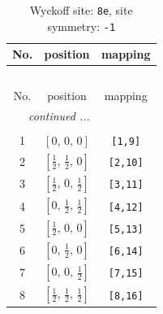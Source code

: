 \documentclass[fleqn,8pt]{jsarticle}
\begin{document}
\renewcommand{\arraystretch}{1.2}
\begin{longtable}{ccc}
\caption{Wyckoff site: {\tt 8e}, site symmetry: {\tt -1}}
 \\
 \hline \hline
No. & position & mapping \\ \hline \endfirsthead

\multicolumn{2}{l}{\tablename\ \thetable{}} \\
 \hline \hline
No. & position & mapping \\ \hline \endhead

 \hline \hline
\multicolumn{2}{r}{\footnotesize\it continued ...} \\ \endfoot

 \hline \hline
\multicolumn{2}{r}{} \\ \endlastfoot

1 & $\left[ 0,\, 0,\, 0 \right]$ & {\tt [1,9]} \\ \hline
2 & $\left[ \frac{1}{2},\, \frac{1}{2},\, 0 \right]$ & {\tt [2,10]} \\ \hline
3 & $\left[ \frac{1}{2},\, 0,\, \frac{1}{2} \right]$ & {\tt [3,11]} \\ \hline
4 & $\left[ 0,\, \frac{1}{2},\, \frac{1}{2} \right]$ & {\tt [4,12]} \\ \hline
5 & $\left[ \frac{1}{2},\, 0,\, 0 \right]$ & {\tt [5,13]} \\ \hline
6 & $\left[ 0,\, \frac{1}{2},\, 0 \right]$ & {\tt [6,14]} \\ \hline
7 & $\left[ 0,\, 0,\, \frac{1}{2} \right]$ & {\tt [7,15]} \\ \hline
8 & $\left[ \frac{1}{2},\, \frac{1}{2},\, \frac{1}{2} \right]$ & {\tt [8,16]} \\
\end{longtable}
\renewcommand{\arraystretch}{1.2}
\end{document}
